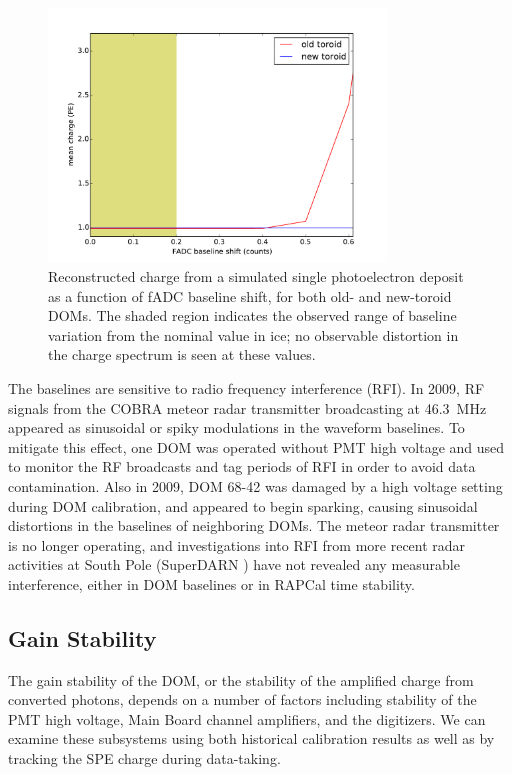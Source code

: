 \begin{figure}[!h]
 \centering
 \includegraphics[width=0.8\textwidth]{graphics/dom/reliability/charge_fadcshift.pdf}
 \caption{Reconstructed charge from a simulated single photoelectron
   deposit as a function of fADC baseline shift, for both old- and
   new-toroid DOMs. The shaded region indicates the observed range of 
   baseline variation from the nominal value in ice; no observable
   distortion in the charge spectrum is seen at these values.}
 \label{fig:charge_fadcshift}
\end{figure}

The baselines are sensitive to radio frequency interference (RFI). In
2009, RF signals from the COBRA meteor radar transmitter broadcasting at
46.3~MHz \cite{meteor_radar}
appeared as sinusoidal or spiky modulations in the waveform
baselines.  To mitigate this effect, one DOM was operated without PMT high
voltage and used to monitor the RF broadcasts and tag periods of RFI in
order to avoid data contamination.  Also
in 2009, DOM 68-42 was damaged by a high voltage setting during DOM
calibration, and appeared to begin sparking, causing sinusoidal distortions
in the baselines of neighboring DOMs. The meteor radar
transmitter is no longer operating, and investigations into RFI
from more recent radar activities at South Pole (SuperDARN
\cite{superdarn}) have not revealed any measurable interference, either in DOM
baselines or in RAPCal time stability. 

\subsection{\label{sec:gain_stability}Gain Stability}

The gain stability of the DOM, or the stability of the amplified charge
from converted photons, depends on a number of factors including stability
of the PMT high voltage, Main Board channel amplifiers, and the digitizers.
We can examine these subsystems using both historical calibration results
as well as by tracking the SPE charge during data-taking.


